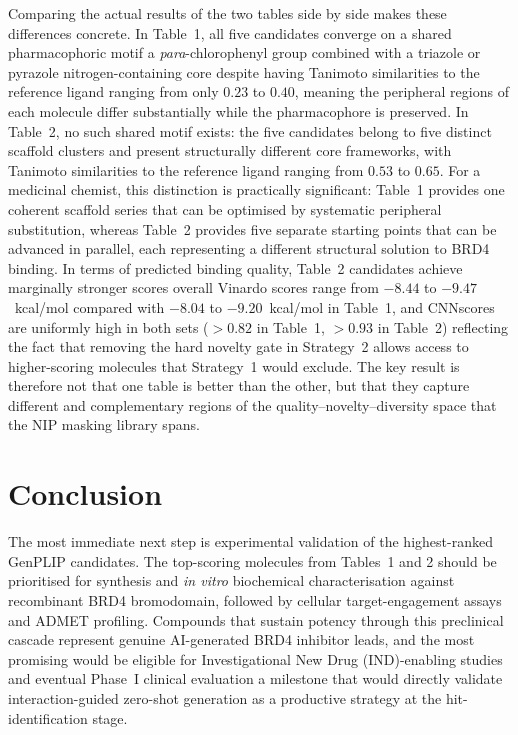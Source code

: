 \documentclass[a4paper,12pt]{article}
\begin{document}
Comparing the actual results of the two tables side by side
makes these differences concrete.
In Table~1, all five candidates converge on a shared
pharmacophoric motif   a \emph{para}-chlorophenyl group
combined with a triazole or pyrazole nitrogen-containing
core   despite having Tanimoto similarities to the reference
ligand ranging from only $0.23$ to $0.40$, meaning the
peripheral regions of each molecule differ substantially while
the pharmacophore is preserved.
In Table~2, no such shared motif exists: the five candidates
belong to five distinct scaffold clusters and present
structurally different core frameworks, with Tanimoto
similarities to the reference ligand ranging from $0.53$ to
$0.65$.
For a medicinal chemist, this distinction is practically
significant: Table~1 provides one coherent scaffold series
that can be optimised by systematic peripheral substitution,
whereas Table~2 provides five separate starting points that
can be advanced in parallel, each representing a different
structural solution to BRD4 binding.
In terms of predicted binding quality, Table~2 candidates
achieve marginally stronger scores overall Vinardo scores
range from $-8.44$ to $-9.47$~kcal/mol compared with
$-8.04$ to $-9.20$~kcal/mol in Table~1, and CNNscores are
uniformly high in both sets ($> 0.82$ in Table~1,
$> 0.93$ in Table~2) reflecting the fact that removing
the hard novelty gate in Strategy~2 allows access to
higher-scoring molecules that Strategy~1 would exclude.
The key result is therefore not that one table is better than
the other, but that they capture different and complementary
regions of the quality--novelty--diversity space that the NIP
masking library spans.
 
\section{Conclusion}
The most immediate next step is experimental validation of the
highest-ranked GenPLIP candidates.
The top-scoring molecules from Tables~1 and 2 should be prioritised
for synthesis and \textit{in vitro} biochemical characterisation
against recombinant BRD4 bromodomain, followed by cellular
target-engagement assays and ADMET profiling.
Compounds that sustain potency through this preclinical cascade
represent genuine AI-generated BRD4 inhibitor leads, and the most
promising would be eligible for Investigational New Drug
(IND)-enabling studies and eventual Phase~I clinical evaluation a
milestone that would directly validate interaction-guided zero-shot
generation as a productive strategy at the hit-identification stage.
 
\end{document}
